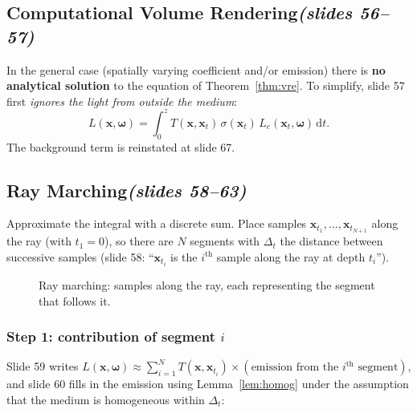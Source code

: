 \documentclass[11pt,a4paper]{article}
\newcommand{\slides}[1]{\texorpdfstring{\hfill{\normalfont\small\emph{(slides #1)}}}{ (slides #1)}}
\newcommand{\x}{\bm{x}}
\newcommand{\w}{\bm{\omega}}
\newcommand{\dd}{\,\mathrm{d}}
\theoremstyle{remark}\newtheorem*{remark}{Remark}
\begin{document}
\subsection{Computational Volume Rendering\slides{56--57}}

In the general case (spatially varying coefficient and/or emission) there is \textbf{no analytical solution} to the equation of Theorem~\ref{thm:vre}. To simplify, slide 57 first \emph{ignores the light from outside the medium}:
\[
L(\x,\w)=\int_0^zT(\x,\x_t)\,\sigma(\x_t)\,L_e(\x_t,\w)\dd t .
\]
The background term is reinstated at slide 67.

\subsection{Ray Marching\slides{58--63}}

Approximate the integral with a discrete sum. Place samples $\x_{t_1},\dots,\x_{t_{N+1}}$ along the ray (with $t_1=0$), so there are $N$ segments with $\Delta_t$ the distance between successive samples (slide 58: ``$\x_{t_i}$ is the $i^{\mathrm{th}}$ sample along the ray at depth $t_i$'').

\begin{figure}[h]
\centering
{}
\caption{Ray marching: samples along the ray, each representing the segment that follows it.}\label{fig:march}
\end{figure}

\subsubsection*{Step 1: contribution of segment $i$}
Slide 59 writes $L(\x,\w)\approx\sum_{i=1}^NT(\x,\x_{t_i})\times(\text{emission from the }i^{\mathrm{th}}\text{ segment})$, and slide 60 fills in the emission using Lemma~\ref{lem:homog} under the assumption that the medium is homogeneous within $\Delta_t$:
\end{document}
